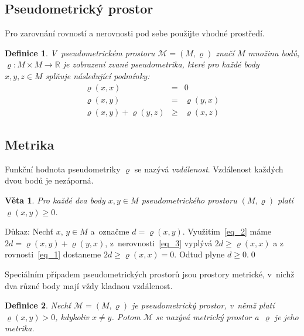 \documentclass[11pt, twocolumn, a4paper]{article}
\theoremstyle{plain}
\newtheorem{defin}{Definice}
\theoremstyle{plain}
\newtheorem{veta}{Věta}
\begin{document}
\subsection{Pseudometrický prostor}
Pro zarovnání rovností a nerovnosti pod sebe použijte vhodné prostředí.

\begin{defin}
V~\emph{pseudometrickém prostoru} $\mathcal{M} = (M, \varrho)$ 
značí $M$ množinu bodů, $\varrho : M \times M \rightarrow \mathbb{R} $ 
je zobrazení zvané \emph{pseudometrika}, které pro každé 
body $ x, y, z \in M $ splňuje následující podmínky:
\setcounter{equation}{0}
\begin{eqnarray}
    \varrho(x, x) & = & 0 \label{eq_1} \\ 
    \varrho(x, y) & = & \varrho(y, x) \label{eq_2} \\ 
    \varrho(x, y) + \varrho(y, z) & \geq & \varrho(x, z) \label{eq_3} 
\end{eqnarray}
    
\end{defin}

\subsection{Metrika}
Funkční hodnota pseudometriky $\varrho$ se nazývá \emph{vzdálenost}.
Vzdálenost každých dvou bodů je nezáporná.

\begin{veta}
    \label{lem_1}
    Pro každé dva body $ x, y \in M$ pseudometrického prostoru $(M, \varrho)$ 
    platí $\varrho(x, y) \geq 0$.
\end{veta}

Důkaz: Nechť $x,\,y \in M$ a~označme $d = \varrho(x, y)$. Využitím~\eqref{eq_2} máme 
$ 2d = \varrho(x, y) + \varrho(y, x)$, z~nerovnosti~\eqref{eq_3} vyplývá $2d \geq \varrho(x,x)$
a z rovnosti~\eqref{eq_1} dostaneme $2d \geq \varrho(x, x) = 0$. Odtud plyne $d \geq 0$.\qed

Speciálním případem pseudometrických prostorů jsou prostory metrické,
v~nichž dva různé body mají vždy kladnou vzdálenost.

\begin{defin}
    \label{def_2}Nechť $\mathcal{M} = (M, \varrho)$ je pseudometrický prostor, 
    v~němž platí $\varrho(x, y) > 0$, kdykoliv $ x \neq y$. Potom $ \mathcal{M} $ se nazývá \emph{metrický prostor}
    a~$\varrho$ je jeho \emph{metrika}. 
\end{defin}
\end{document}
